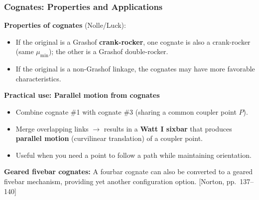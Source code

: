 \documentclass[10pt,aspectratio=43]{beamer}
\newcommand{\pref}[1]{\vfill\hfill{\scriptsize\color{gray}[Norton, pp.~#1]}}
\begin{document}
\begin{frame}
\frametitle{Cognates: Properties and Applications}

\textbf{Properties of cognates} (Nolle/Luck):
\begin{itemize}
  \item If the original is a Grashof \textbf{crank-rocker}, one cognate is also a crank-rocker (same $\mu_{\min}$); the other is a Grashof double-rocker.
  \item If the original is a non-Grashof linkage, the cognates may have more favorable characteristics.
\end{itemize}

\vspace{6pt}
\textbf{Practical use: Parallel motion from cognates}
\begin{itemize}
  \item Combine cognate \#1 with cognate \#3 (sharing a common coupler point $P$).
  \item Merge overlapping links $\to$ results in a \textbf{Watt I sixbar} that produces \textbf{parallel motion} (curvilinear translation) of a coupler point.
  \item Useful when you need a point to follow a path while maintaining orientation.
\end{itemize}

\vspace{4pt}
\textbf{Geared fivebar cognates:} A fourbar cognate can also be converted to a geared fivebar mechanism, providing yet another configuration option.
\pref{137--140}
\end{frame}

\end{document}
